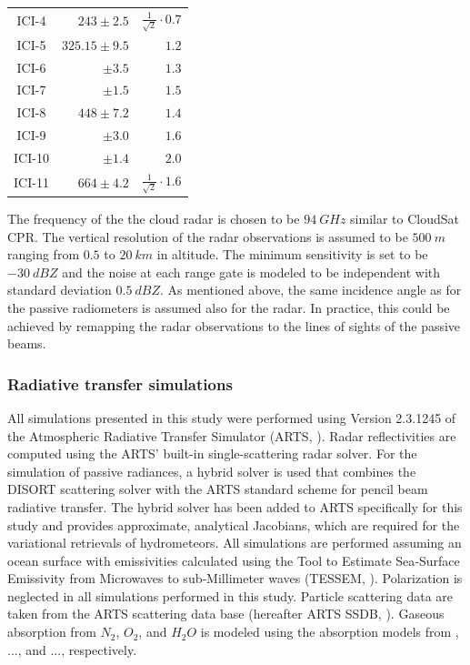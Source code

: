 \documentclass[journal abbreviation, manuscript]{copernicus}
\begin{document}
\begin{table}[hbpt]
\begin{tabular}{c|r|r}
    ICI-4  & $243    \pm 2.5$ & $\frac{1}{\sqrt{2}} \cdot 0.7$\\
    ICI-5  & $325.15 \pm 9.5$ & $1.2$\\
    ICI-6  & $       \pm 3.5$ & $1.3$\\
    ICI-7  & $       \pm 1.5$ & $1.5$\\
    ICI-8  & $448    \pm 7.2$ & $1.4$\\
    ICI-9  & $       \pm 3.0$ & $1.6$\\
    ICI-10 & $       \pm 1.4$ & $2.0$\\
    ICI-11 & $664    \pm 4.2$ & $\frac{1}{\sqrt{2}} \cdot 1.6$\\
    \end{tabular}
\end{table}

The frequency of the the cloud radar is chosen to be $94\ \unit{GHz}$ similar to
CloudSat CPR. The vertical resolution of the radar observations is assumed to be
$500\ \unit{m}$ ranging from $0.5$ to $20\ \unit{km}$ in altitude. The minimum
sensitivity is set to be $-30\ \unit{dBZ}$ and the noise at each range gate is
modeled to be independent with standard deviation $0.5\ \unit{dBZ}$. As mentioned
above, the same incidence angle as for the passive radiometers is assumed also
for the radar. In practice, this could be achieved by remapping the radar
observations to the lines of sights of the passive beams.

\subsubsection{Radiative transfer simulations}
\label{sec:orge741b86}

All simulations presented in this study were performed using Version 2.3.1245 of
the Atmospheric Radiative Transfer Simulator (ARTS, \cite{arts18}). Radar
reflectivities are computed using the ARTS' built-in single-scattering radar
solver. For the simulation of passive radiances, a hybrid solver is used that
combines the DISORT \citep{disort00} scattering solver with the ARTS standard
scheme for pencil beam radiative transfer. The hybrid solver has been added to
ARTS specifically for this study and provides approximate, analytical Jacobians,
which are required for the variational retrievals of hydrometeors. All
simulations are performed assuming an ocean surface with emissivities calculated
using the Tool to Estimate Sea‐Surface Emissivity from Microwaves to
sub‐Millimeter waves (TESSEM, \cite{prigent16}). Polarization is neglected in
all simulations performed in this study. Particle scattering data are taken from
the ARTS scattering data base (hereafter ARTS SSDB, \citet{eriksson18}). Gaseous
absorption from $N_2$, $O_2$, and $H_2O$ is modeled using the absorption models
from \cite{rosenkranz98}, ..., and ..., respectively.
\end{document}
